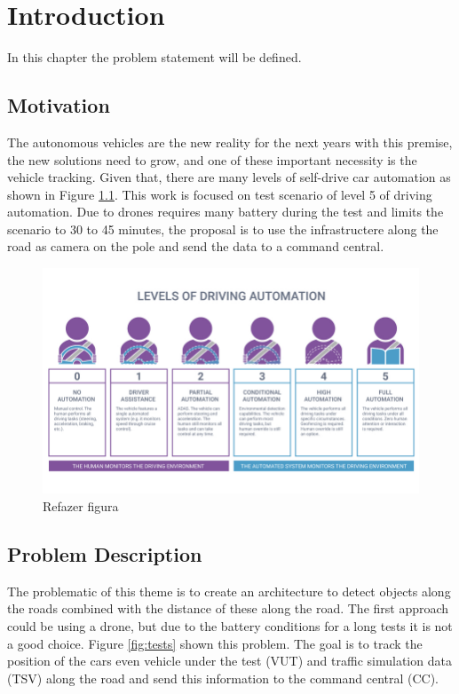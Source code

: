 \chapter{Introduction} \label{introducao}
In this chapter the problem statement will be defined. 
\section{Motivation}

The autonomous vehicles are the new reality for the next years with this premise, the new solutions need to grow, and one of these important necessity is the vehicle tracking. Given that, there are many levels of self-drive car automation as shown in Figure \ref{fig:automation}. This work is focused on test scenario of level 5 of driving automation. Due to drones requires many battery during the test and limits the scenario to 30 to 45 minutes, the proposal is to use the infrastructere along the road as camera on the pole and send the data to a command central.

\begin{figure}[H]
\centering
\includegraphics[scale=0.8]{imagens/automation.jpg}
\caption{Refazer figura}
\label{fig:automation}
\end{figure}

\section{Problem Description}

The problematic of this theme is to create an architecture to detect objects along the roads combined with the distance of these along the road. The first approach could be using a drone, but due to the battery conditions for a long tests it is not a good choice. Figure \ref{fig:tests} shown this problem. The goal is to track the position of the cars even vehicle under the test (VUT) and traffic simulation data (TSV) along the road and send this information to the command central (CC). 

